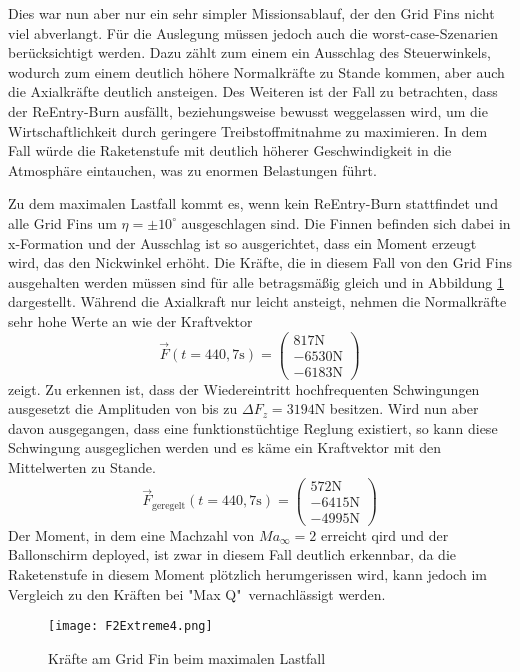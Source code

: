 Dies war nun aber nur ein sehr simpler Missionsablauf, der den Grid Fins nicht viel abverlangt. Für die Auslegung müssen jedoch auch die worst-case-Szenarien berücksichtigt werden. Dazu zählt zum einem ein Ausschlag des Steuerwinkels, wodurch zum einem deutlich höhere Normalkräfte zu Stande kommen, aber auch die Axialkräfte deutlich ansteigen. Des Weiteren ist der Fall zu betrachten, dass der ReEntry-Burn ausfällt, beziehungsweise bewusst weggelassen wird, um die Wirtschaftlichkeit durch geringere Treibstoffmitnahme zu maximieren. In dem Fall würde die Raketenstufe mit deutlich höherer Geschwindigkeit in die Atmosphäre eintauchen, was zu enormen Belastungen führt.

Zu dem maximalen Lastfall kommt es, wenn kein ReEntry-Burn stattfindet und alle Grid Fins um $\eta = \pm 10^\circ$ ausgeschlagen sind. Die Finnen befinden sich dabei in x-Formation und der Ausschlag ist so ausgerichtet, dass ein Moment erzeugt wird, das den Nickwinkel erhöht. Die Kräfte, die in diesem Fall von den Grid Fins ausgehalten werden müssen sind für alle betragsmäßig gleich und in Abbildung \ref{abb_FExtreme} dargestellt. Während die Axialkraft nur leicht ansteigt, nehmen die Normalkräfte sehr hohe Werte an wie der Kraftvektor
\begin{equation}
	\vec{F}(t=440,7\mathrm{s})
	=\left(\begin{array}{c}817\mathrm{N}\\-6530\mathrm{N}\\-6183\mathrm{N}\end{array}\right)
\end{equation}
zeigt. Zu erkennen ist, dass der Wiedereintritt hochfrequenten Schwingungen ausgesetzt die Amplituden von bis zu $\Delta F_z = 3194$N besitzen. Wird nun aber davon ausgegangen, dass eine funktionstüchtige Reglung existiert, so kann diese Schwingung ausgeglichen werden und es käme ein Kraftvektor mit den Mittelwerten zu Stande.
\begin{equation}\label{eq_Fmax}
\vec{F}_\mathrm{geregelt}(t=440,7\mathrm{s})
=\left(\begin{array}{c}572\mathrm{N}\\-6415\mathrm{N}\\-4995\mathrm{N}\end{array}\right)
\end{equation}
Der Moment, in dem eine Machzahl von $Ma_\infty = 2$ erreicht qird und der Ballonschirm deployed, ist zwar in diesem Fall deutlich erkennbar, da die Raketenstufe in diesem Moment plötzlich herumgerissen wird, kann jedoch im Vergleich zu den Kräften bei "Max Q"\ vernachlässigt werden.
\begin{figure}[h] 
	\centering
	\texttt{[image: F2Extreme4.png]}
	\caption{Kräfte am Grid Fin beim maximalen Lastfall}
	\label{abb_FExtreme}
\end{figure}\\
